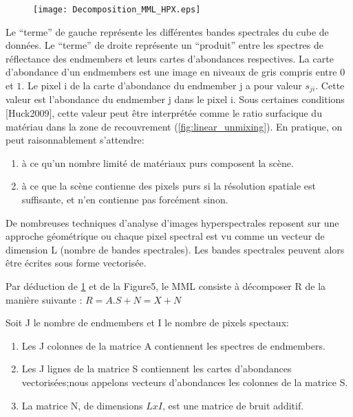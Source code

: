 \begin{figure}[h]
  \centering
  \texttt{[image: Decomposition\_MML\_HPX.eps]}
  \label{fig:decomp_mml}
\end{figure}

Le ``terme'' de gauche représente les différentes bandes spectrales du
cube de données. Le ``terme'' de droite représente un ``produit''
entre les spectres de réflectance des endmembers et leurs cartes
d'abondances respectives. La carte d'abondance d'un endmembers est une
image en niveaux de gris compris entre $0$ et $1$. Le pixel i de la carte
d'abondance du endmember j a pour valeur $s_{ji}$. Cette valeur est
l'abondance du endmember j dans le pixel i. Sous certaines conditions
[Huck2009], cette valeur peut être interprétée comme le ratio
surfacique du matériau dans la zone de recouvrement (\ref{fig:linear_unmixing}).  En
pratique, on peut raisonnablement s'attendre: 

\begin{enumerate}
\item{à ce qu'un nombre
limité de matériaux purs composent la scène.}
\item{à ce que la scène
contienne des pixels purs si la résolution spatiale est suffisante, et
n'en contienne pas forcément sinon.}
\end{enumerate}
 
De nombreuses techniques d'analyse d'images hyperspectrales reposent
sur une approche géométrique ou chaque pixel spectral est vu comme un
vecteur de dimension L (nombre de bandes spectrales). Les
bandes spectrales peuvent alors être écrites sous forme vectorisée.


Par déduction de \ref{fig:decomp_mml} et de la Figure5, le MML consiste à décomposer R
de la manière suivante : $R= A.S + N = X + N$

Soit J le nombre de endmembers et I le nombre de pixels spectaux: 
\begin{enumerate}
\item{Les J colonnes de la matrice A contiennent les spectres de endmembers.}
\item{Les J lignes de la matrice S contiennent les cartes d'abondances
vectorisées;nous appelons vecteurs d'abondances les colonnes de la
matrice S.}
\item{La matrice N, de dimensions $LxI$, est une matrice de bruit
additif.}
\end{enumerate}

